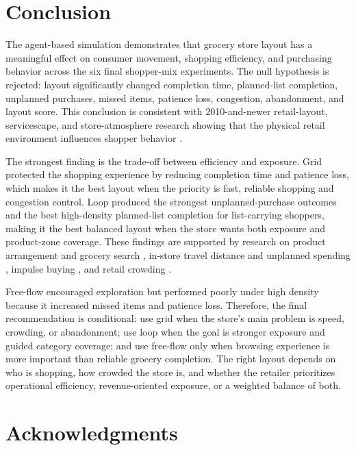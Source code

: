 \documentclass[sigconf,nonacm]{acmart}
\begin{document}
\section{Conclusion}

The agent-based simulation demonstrates that grocery store layout has a meaningful effect on consumer movement, shopping efficiency, and purchasing behavior across the six final shopper-mix experiments. The null hypothesis is rejected: layout significantly changed completion time, planned-list completion, unplanned purchases, missed items, patience loss, congestion, abandonment, and layout score. This conclusion is consistent with 2010-and-newer retail-layout, servicescape, and store-atmosphere research showing that the physical retail environment influences shopper behavior \citep{mari2013,spence2014,hwangbo2017,ozgormus2020,pantano2021}.

The strongest finding is the trade-off between efficiency and exposure. Grid protected the shopping experience by reducing completion time and patience loss, which makes it the best layout when the priority is fast, reliable shopping and congestion control. Loop produced the strongest unplanned-purchase outcomes and the best high-density planned-list completion for list-carrying shoppers, making it the best balanced layout when the store wants both exposure and product-zone coverage. These findings are supported by research on product arrangement and grocery search \citep{seva2019,andrada2020}, in-store travel distance and unplanned spending \citep{hui2013}, impulse buying \citep{bellini2017,kacen2012,stilley2010}, and retail crowding \citep{blut2020,aydinli2021}.

Free-flow encouraged exploration but performed poorly under high density because it increased missed items and patience loss. Therefore, the final recommendation is conditional: use grid when the store's main problem is speed, crowding, or abandonment; use loop when the goal is stronger exposure and guided category coverage; and use free-flow only when browsing experience is more important than reliable grocery completion. The right layout depends on who is shopping, how crowded the store is, and whether the retailer prioritizes operational efficiency, revenue-oriented exposure, or a weighted balance of both.

\section*{Acknowledgments}
\end{document}
